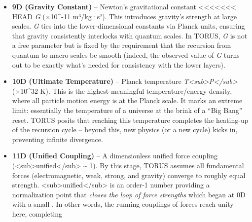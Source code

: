 \documentclass[]{article}
\begin{document}
{\begin{itemize}
>>>>>>> 5d40795 (Fix: robust Unicode/maths in LaTeX and explicit push to main in workflow)
  so it combines the 7D and 6D constants into a macroscopic energy scale
  per mole per degree​. TORUS treats \emph{R} as a fundamental constant
  to ensure a seamless link between microscopic thermal energy and
  macroscopic thermodynamic behavior (one mole of particles carrying
  k\textless{}sub\textgreater{}B\textless{}/sub\textgreater{}T each
  yields \emph{R}T total)​.
\item
  \textbf{9D (Gravity Constant)} -- Newton's gravitational constant
<<<<<<< HEAD
  \emph{G} (×10\^{}-11 m³/kg·s²)\hspace{0pt}. This introduces
  gravity's strength at large scales. \emph{G} ties into the
  lower-dimensional constants via Planck units, ensuring that gravity
  consistently interlocks with quantum scales\hspace{0pt}. In TORUS,
  \emph{G} is not a free parameter but is fixed by the requirement that
  the recursion from quantum to macro scales be smooth (indeed, the
  observed value of \emph{G} turns out to be exactly what's needed for
  consistency with the lower layers)\hspace{0pt}.
\item
  \textbf{10D (Ultimate Temperature)} -- Planck temperature
  \emph{T\textless sub\textgreater P\textless/sub\textgreater{}} (×10\^{}32 K)\hspace{0pt}. This is the highest meaningful
  temperature/energy density, where all particle motion energy is at the
  Planck scale. It marks an extreme limit: essentially the temperature
  of a universe at the brink of a ``Big Bang'' reset. TORUS posits that
  reaching this temperature completes the heating-up of the recursion
  cycle\hspace{0pt} -- beyond this, new physics (or a new cycle) kicks
  in, preventing infinite divergence.
\item
  \textbf{11D (Unified Coupling)} -- A dimensionless unified force
  coupling
  (\alpha\textless sub\textgreater unified\textless/sub\textgreater{}
  \textasciitilde{} 1)\hspace{0pt}. By this stage, TORUS assumes all
  fundamental forces (electromagnetic, weak, strong, and gravity)
  converge to roughly equal strength.
  \alpha\textless sub\textgreater unified\textless/sub\textgreater{} is an
  order-1 number providing a normalization point that \emph{closes the
  loop of force strengths} which began at 0D with a small \alpha. In other
  words, the running couplings of forces reach unity here, completing

\end{itemize}}
\end{document}
